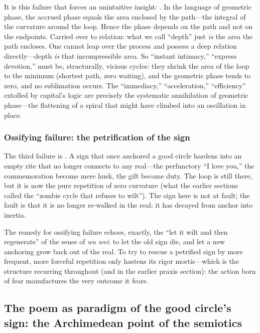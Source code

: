 It is this failure that forces an unintuitive insight: . In the language of geometric phase, the accrued phase equals the area enclosed by the path---the integral of the curvature around the loop. Hence the phase depends on the path and not on the endpoints. Carried over to relation: what we call ``depth'' just \emph{is} the area the path encloses. One cannot leap over the process and possess a deep relation directly---depth \emph{is} that incompressible area. So ``instant intimacy,'' ``express devotion,'' must be, structurally, vicious cycles: they shrink the area of the loop to the minimum (shortest path, zero waiting), and the geometric phase tends to zero, and no sublimation occurs. The ``immediacy,'' ``acceleration,'' ``efficiency'' extolled by capital's logic are precisely the systematic annihilation of geometric phase---the flattening of a spiral that might have climbed into an oscillation in place. 

\subsubsection{Ossifying failure: the petrification of the sign}

The third failure is . A sign that once anchored a good circle hardens into an empty rite that no longer connects to any real---the perfunctory ``I love you,'' the commemoration become mere husk, the gift become duty. The loop is still there, but it is now the pure repetition of zero curvature (what the earlier sections called the ``zombie cycle that refuses to wilt''). The sign here is not at fault; the fault is that it is no longer re-walked in the real; it has decayed from anchor into inertia.

The remedy for ossifying failure echoes, exactly, the ``let it wilt and then regenerate'' of the sense of \emph{wu wei}: to let the old sign die, and let a new anchoring grow back out of the real. To try to rescue a petrified sign by more frequent, more forceful repetition only hastens its rigor mortis---which is the structure recurring throughout (and in the earlier praxis section): the action born of fear manufactures the very outcome it fears.

\subsection{The poem as paradigm of the good circle's sign: the Archimedean point of the semiotics}
\label{p09:sec:poem}

